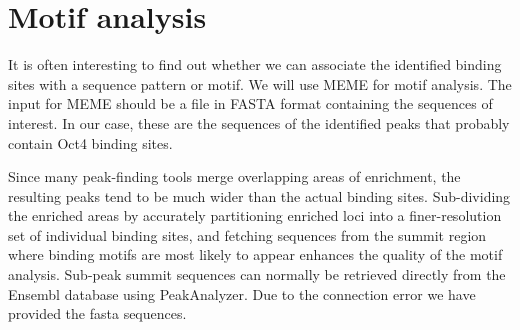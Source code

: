 \section{Motif analysis}

\begin{information}
It is often interesting to find out whether we can associate the identified 
binding sites with a sequence pattern or motif. We will use MEME for motif
analysis. The input for MEME should be a file in FASTA format containing the
sequences of interest. In our case, these are the sequences of the identified
peaks that probably contain Oct4 binding sites.

Since many peak-finding tools merge overlapping areas of enrichment, the
resulting peaks tend to be much wider than the actual binding sites.
Sub-dividing the enriched areas by accurately partitioning enriched loci into a
finer-resolution set of individual binding sites, and fetching sequences from
the summit region where binding motifs are most likely to appear enhances the
quality of the motif analysis. Sub-peak summit sequences can normally be retrieved
directly from the Ensembl database using PeakAnalyzer. Due to the connection error we have provided the fasta sequences.
\end{information}

